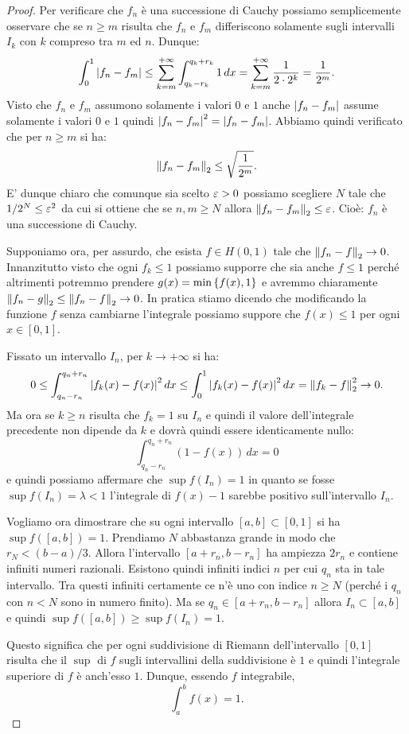 \begin{proof}
Per verificare che $f_n$ è una successione di Cauchy possiamo semplicemente
osservare che se $n\ge m$ risulta che $f_n$ e $f_m$ differiscono solamente
sugli intervalli $I_k$ con $k$ compreso tra $m$ ed $n$. Dunque:
\[
  \int_0^1 {\left|f_n - f_m\right|}
  \le \sum_{k=m}^{+\infty} \int_{q_k-r_k}^{q_k+r_k} 1\,dx
  = \sum_{k=m}^{+\infty}\frac{1}{2\cdot 2^k} = \frac{1}{2^m}.
\]
Visto che $f_n$ e $f_m$ assumono solamente i valori $0$ e $1$ anche ${\left|f_n-f_m\right|}$
assume solamente i valori $0$ e $1$ quindi ${\left|f_n-f_m\right|}^2={\left|f_n-f_m\right|}$.
Abbiamo quindi verificato che per $n\ge m$ si ha:
\[
  {\left\Vert  f_n - f_m\right\Vert}_2 \le \sqrt{\frac{1}{2^m}}.
\]
E' dunque chiaro che comunque sia scelto $\varepsilon>0$ possiamo scegliere $N$
tale che $1/2^N \le \varepsilon^2$ da cui si ottiene che se $n,m\ge N$
allora ${\left\Vert  f_n-f_m\right\Vert}_2 \le \varepsilon$. Cioè: $f_n$ è una successione di Cauchy.

Supponiamo ora, per assurdo, che esista $f\in H(0,1)$
tale che ${\left\Vert  f_n-f\right\Vert}_2 \to 0$.
Innanzitutto visto che ogni $f_k\le 1$ possiamo supporre che sia anche $f\le 1$
perché altrimenti potremmo prendere $g(x) = \min{\left\{ f(x),1 \right\}}$ e avremmo
chiaramente ${\left\Vert f_n - g\right\Vert}_2 \le {\left\Vert f_n -f\right\Vert}_2 \to 0$. In pratica stiamo dicendo
che modificando la funzione $f$ senza cambiarne l'integrale possiamo suppore
che $f(x)\le 1$ per ogni $x\in[0,1]$.

Fissato un intervallo $I_n$, per $k\to +\infty$ si ha:
\[
  0\le \int_{q_n-r_n}^{q_n+r_n}{\left|f_k(x)-f(x)\right|}^2\, dx
  \le \int_0^1 {\left|f_k(x)-f(x)\right|}^2\, dx = {\left\Vert  f_k -f\right\Vert}_2^2 \to 0.
\]
Ma ora se $k\ge n$ risulta che $f_k=1$ su $I_n$ e quindi il valore dell'integrale
precedente non dipende da $k$ e dovrà quindi essere identicamente nullo:
\[
  \int_{q_n-r_n}^{q_n+r_n} (1-f(x)) \, dx = 0
\]
e quindi possiamo affermare che $\sup f(I_n) = 1$ in quanto se fosse
$\sup f(I_n) = \lambda < 1$
l'integrale di $f(x)-1$ sarebbe positivo
sull'intervallo $I_n$.

Vogliamo ora dimostrare che su ogni intervallo $[a,b]\subset[0,1]$ si ha
$\sup f([a,b])=1$. Prendiamo $N$ abbastanza grande in modo che $r_N < (b-a)/3$.
Allora l'intervallo $[a+r_n, b-r_n]$ ha ampiezza $2 r_n$ e contiene infiniti
numeri razionali. Esistono quindi infiniti indici $n$ per cui $q_n$ sta in tale
intervallo. Tra questi infiniti certamente ce n'è uno con indice $n\ge N$
(perché i $q_n$ con $n< N$ sono in numero finito). Ma se $q_n \in [a+r_n,b-r_n]$
allora $I_n\subset[a,b]$ e quindi $\sup f([a,b])\ge \sup f(I_n) = 1$.

Questo significa che per ogni suddivisione di Riemann dell'intervallo $[0,1]$
risulta che il $\sup$ di $f$ sugli intervallini della suddivisione è $1$ e quindi
l'integrale superiore di $f$ è anch'esso $1$. Dunque, essendo $f$ integrabile,
\[
  \int_a^b f(x) = 1.
\]


\end{proof}
